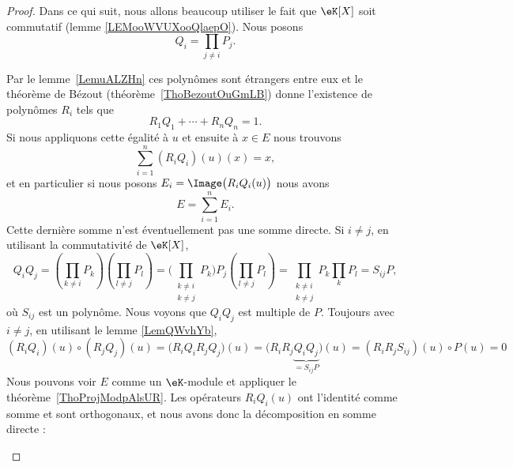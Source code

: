 \begin{proof}
	Dans ce qui suit, nous allons beaucoup utiliser le fait que \( \eK[X]\) soit commutatif (lemme \ref{LEMooWVUXooQlaepO}). Nous posons
	\begin{equation}
		Q_i=\prod_{j\neq i}P_j.
	\end{equation}
	\begin{subproof}

		Par le lemme~\ref{LemuALZHn} ces polynômes sont étrangers entre eux et le théorème de Bézout (théorème~\ref{ThoBezoutOuGmLB}) donne l'existence de polynômes \( R_i\) tels que
		\begin{equation}        \label{EQooMMCVooRzlXpA}
			R_1Q_1+\cdots+R_nQ_n=1.
		\end{equation}
		Si nous appliquons cette égalité à \( u\) et ensuite à \( x\in E\) nous trouvons
		\begin{equation}        \label{EqqVcpUy}
			\sum_{i=1}^n(R_iQ_i)(u)(x)=x,
		\end{equation}
		et en particulier si nous posons \( E_i=\Image\big(R_iQ_i(u)\big)\) nous avons
		\begin{equation}
			E=\sum_{i=1}^nE_i.
		\end{equation}
		Cette dernière somme n'est éventuellement pas une somme directe.
		Si \( i\neq j\), en utilisant la commutativité de \( \eK[X]\),
		\begin{equation}
			Q_iQ_j=\left(\prod_{k\neq i}P_k\right)\left(\prod_{l\neq j}P_l\right)=\Big( \prod_{\substack{k\neq i\\k\neq j}}P_k \Big)P_j\left( \prod_{l\neq j}P_l \right)=\prod_{\substack{k\neq i\\k\neq j}}P_k\prod_kP_l=S_{ij}P,
		\end{equation}
		où \( S_{ij}\) est un polynôme. Nous voyons que \( Q_iQ_j\) est multiple de \( P\).
		Toujours avec \( i\neq j\), en utilisant le lemme \ref{LemQWvhYb},
		\begin{equation}
			(R_iQ_i)(u)\circ (R_jQ_j)(u)=\big( R_iQ_iR_jQ_j \big)(u)=\big( R_iR_j\underbrace{Q_iQ_j}_{=S_{ij}P} \big)(u)=(R_iR_jS_{ij})(u)\circ P(u)=0
		\end{equation}
		Nous pouvons voir \( E\) comme un \( \eK\)-module et appliquer le théorème~\ref{ThoProjModpAlsUR}. Les opérateurs \( R_iQ_i(u)\) ont l'identité comme somme et sont orthogonaux, et nous avons donc la décomposition en somme directe :
		\begin{equation}        \label{EQooJPQLooOZepwZ}

\end{equation}
\end{subproof}
\end{proof}
